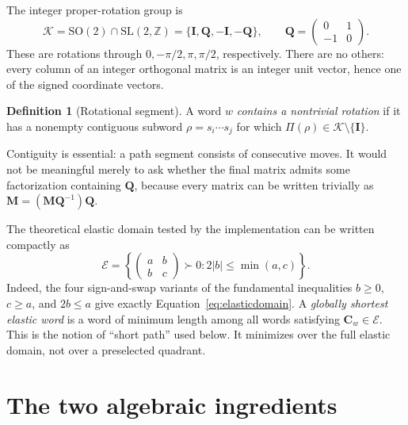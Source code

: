 \documentclass[11pt]{article}
\newcommand{\E}{\mathcal E}
\newcommand{\K}{\mathcal K}
\newcommand{\SLZ}{\mathrm{SL}(2,\mathbb Z)}
\newcommand{\wordprod}{\Pi}
\theoremstyle{definition}
\newtheorem{definition}{Definition}
\begin{document}
The integer proper-rotation group is
\begin{equation}
 \K=\mathrm{SO}(2)\cap\SLZ
 =\{\mathbf I,\mathbf Q,-\mathbf I,-\mathbf Q\},
 \qquad
 \mathbf Q=\begin{pmatrix}0&1\\-1&0\end{pmatrix}.
 \label{eq:rotationgroup}
\end{equation}
These are rotations through \(0,-\pi/2,\pi,\pi/2\), respectively.  There
are no others: every column of an integer orthogonal matrix is an integer
unit vector, hence one of the signed coordinate vectors.

\begin{definition}[Rotational segment]
A word \(w\) \emph{contains a nontrivial rotation} if it has a nonempty
contiguous subword \(\rho=s_i\cdots s_j\) for which
\(\wordprod(\rho)\in\K\setminus\{\mathbf I\}\).
\end{definition}

Contiguity is essential: a path segment consists of consecutive moves.  It
would not be meaningful merely to ask whether the final matrix admits some
factorization containing \(\mathbf Q\), because every matrix can be written
trivially as
\(\mathbf M=(\mathbf M\mathbf Q^{-1})\mathbf Q\).

The theoretical elastic domain tested by the implementation can be written
compactly as
\begin{equation}
 \E=\left\{
 \begin{pmatrix}a&b\\b&c\end{pmatrix}\succ0:
 2|b|\leq \min(a,c)
 \right\}.
 \label{eq:elasticdomain}
\end{equation}
Indeed, the four sign-and-swap variants of the fundamental inequalities
\(b\geq0\), \(c\geq a\), and \(2b\leq a\) give exactly
Equation~\eqref{eq:elasticdomain}.  A \emph{globally shortest elastic word}
is a word of minimum length among all words satisfying \(\mathbf C_w\in\E\).
This is the notion of ``short path'' used below.  It minimizes over the full
elastic domain, not over a preselected quadrant.

\section{The two algebraic ingredients}
\end{document}
